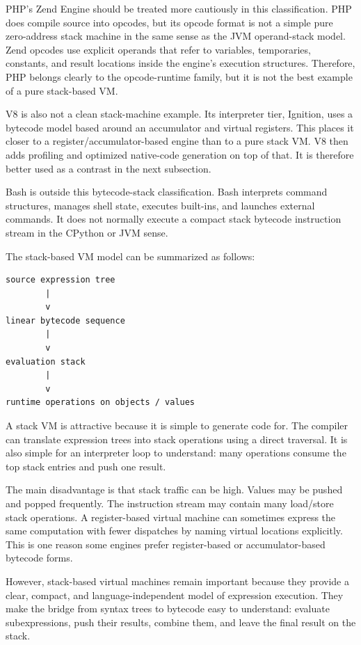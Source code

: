 PHP's Zend Engine should be treated more cautiously in this classification. PHP does compile source into opcodes, but its opcode format is not a simple pure zero-address stack machine in the same sense as the JVM operand-stack model. Zend opcodes use explicit operands that refer to variables, temporaries, constants, and result locations inside the engine's execution structures. Therefore, PHP belongs clearly to the opcode-runtime family, but it is not the best example of a pure stack-based VM.

V8 is also not a clean stack-machine example. Its interpreter tier, Ignition, uses a bytecode model based around an accumulator and virtual registers. This places it closer to a register/accumulator-based engine than to a pure stack VM. V8 then adds profiling and optimized native-code generation on top of that. It is therefore better used as a contrast in the next subsection.

Bash is outside this bytecode-stack classification. Bash interprets command structures, manages shell state, executes built-ins, and launches external commands. It does not normally execute a compact stack bytecode instruction stream in the CPython or JVM sense.

The stack-based VM model can be summarized as follows:

\begin{verbatim}
source expression tree
        |
        v
linear bytecode sequence
        |
        v
evaluation stack
        |
        v
runtime operations on objects / values
\end{verbatim}

A stack VM is attractive because it is simple to generate code for. The compiler can translate expression trees into stack operations using a direct traversal. It is also simple for an interpreter loop to understand: many operations consume the top stack entries and push one result.

The main disadvantage is that stack traffic can be high. Values may be pushed and popped frequently. The instruction stream may contain many load/store stack operations. A register-based virtual machine can sometimes express the same computation with fewer dispatches by naming virtual locations explicitly. This is one reason some engines prefer register-based or accumulator-based bytecode forms.

However, stack-based virtual machines remain important because they provide a clear, compact, and language-independent model of expression execution. They make the bridge from syntax trees to bytecode easy to understand: evaluate subexpressions, push their results, combine them, and leave the final result on the stack.

